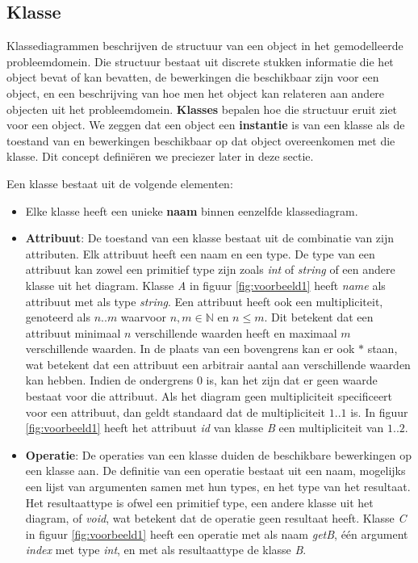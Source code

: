 \subsection{Klasse}

Klassediagrammen beschrijven de structuur van een object in het gemodelleerde probleemdomein. Die structuur bestaat uit discrete stukken informatie die het object bevat of kan bevatten, de bewerkingen die beschikbaar zijn voor een object, en een beschrijving van hoe men het object kan relateren aan andere objecten uit het probleemdomein. \textbf{Klasses} bepalen hoe die structuur eruit ziet voor een object. We zeggen dat een object een \textbf{instantie} is van een klasse als de toestand van en bewerkingen beschikbaar op dat object overeenkomen met die klasse. Dit concept defini\"eren we preciezer later in deze sectie.

Een klasse bestaat uit de volgende elementen:

\begin{itemize}
	\item Elke klasse heeft een unieke \textbf{naam} binnen eenzelfde klassediagram.
	\item \textbf{Attribuut}: De toestand van een klasse bestaat uit de combinatie van zijn attributen. Elk attribuut heeft een naam en een type. De type van een attribuut kan zowel een primitief type zijn zoals \textit{int} of \textit{string} of een andere klasse uit het diagram. Klasse \textit{A} in figuur \ref{fig:voorbeeld1} heeft \textit{name} als attribuut met als type \textit{string}. Een attribuut heeft ook een multipliciteit, genoteerd als $n..m$ waarvoor $n,m \in \mathbb{N}$ en $n \leq m$. Dit betekent dat een attribuut minimaal $n$ verschillende waarden heeft en maximaal $m$ verschillende waarden. In de plaats van een bovengrens kan er ook $*$ staan, wat betekent dat een attribuut een arbitrair aantal aan verschillende waarden kan hebben. Indien de ondergrens 0 is, kan het zijn dat er geen waarde bestaat voor die attribuut. Als het diagram geen multipliciteit specificeert voor een attribuut, dan geldt standaard dat de multipliciteit $1..1$ is. In figuur \ref{fig:voorbeeld1} heeft het attribuut \textit{id} van klasse \textit{B} een multipliciteit van $1..2$.
	\item \textbf{Operatie}: De operaties van een klasse duiden de beschikbare bewerkingen op een klasse aan. De definitie van een operatie bestaat uit een naam, mogelijks een lijst van argumenten samen met hun types, en het type van het resultaat. Het resultaattype is ofwel een primitief type, een andere klasse uit het diagram, of \textit{void}, wat betekent dat de operatie geen resultaat heeft. Klasse \textit{C} in figuur \ref{fig:voorbeeld1} heeft een operatie met als naam \textit{getB}, \'e\'en argument \textit{index} met type \textit{int}, en met als resultaattype de klasse \textit{B}.
\end{itemize}

